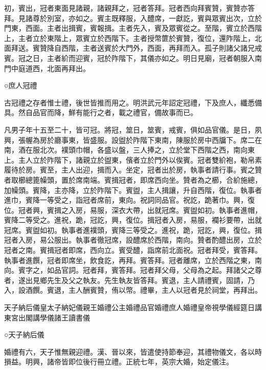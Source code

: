 初，賓出，冠者東面見諸親，諸親拜之，冠者答拜。冠者西向拜賓贊，賓贊亦答拜。見諸尊於別室，亦如之。賓主既釋服，入醴席，一獻訖，賓與眾賓出次，立於門東，西面。主者出揖賓，賓報揖。主者先入，賓及眾賓從之。至階，賓立於西階上，主者立於東階上，眾賓立於西階下。主者授幣篚於賓贊，復位，還阼階上，北面拜送。賓贊降自西階，主者送賓於大門外，西面，再拜而入。孤子則諸父諸兄戒賓。冠之日，主者紒而迎賓，冠於阼階下，其儀亦如之。明日見廟，冠者朝服入南門中庭道西，北面再拜出。

○庶人冠禮

古冠禮之存者惟士禮，後世皆推而用之。明洪武元年詔定冠禮，下及庶人，纖悉備具。然自品官而降，鮮有能行之者，載之禮官，備故事而已。

凡男子年十五至二十，皆可冠。將冠，筮日，筮賓，戒賓，俱如品官儀。是日，夙興，張幄為房於廳事東，皆盛服。設盥於阼階下東南，陳服於房中西牖下。席二在南，酒在服北次。襆頭巾帽，各盛以盤，三人捧之，立於堂下西階之西，南向東上。主人立於阼階下，諸親立於盥東，儐者立於門外以俟賓。冠者雙紒袍，勒帛素履待於房。賓至，主人出迎，揖而入。坐定，冠者出於房，執事者請行事。賓之贊者取櫛總篦幧頭，置於席南端。賓揖冠者，即席西向坐。贊者為之櫛，合紒施總，加幧頭。賓降，主亦降，立於阼階下。賓盥，主人揖讓，升自西階，復位。執事者進巾，賓降一等受之，詣冠者席前，東向。祝詞同品官。祝訖，跪著巾。興，復位。冠者興，賓揖之入房，易服，深衣大帶，出就冠席。賓盥如初。執事者進帽，賓降二等受之。進祝，跪，冠訖，興，復位。揖冠者入房，易服，襴衫要帶，出就冠席。賓盥如初。執事者進襆頭，賓降三等受之。進祝，跪，冠訖，興，復位。揖冠者入房，易公服出。執事者徹冠席，設醴席於西階，南向。贊者酌醴出房，立於冠者之南。賓揖冠者即席，西向立。賓受醴，詣席前北面祝。冠者拜受，賓答拜。執事者進饌，冠者即席坐，飲食訖，再拜。賓答拜。冠者離席，立於西階之東，南向。賓字之，如品官詞。冠者拜，賓答拜。冠者拜父母，父母為之起。拜諸父之尊者，遂出見鄉先生及父之執友。先生執友皆答拜。賓退，主人請禮賓，固請，乃入，設酒饌。賓退，主人酬賓贊，侑以幣。禮畢，主人以冠者見於祠堂，再拜出。

天子納后儀皇太子納妃儀親王婚禮公主婚禮品官婚禮庶人婚禮皇帝視學儀經筵日講東宮出閣講學儀諸王讀書儀

○天子納后儀

婚禮有六，天子惟無親迎禮。漢、晉以來，皆遣使持節奉迎，其禮物儀文，各以時損益。明興，諸帝皆即位後行冊立禮。正統七年，英宗大婚，始定儀注。

